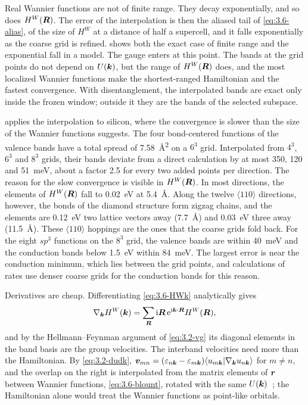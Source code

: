 Real Wannier functions are not of finite range. They decay exponentially, and so does $H^W(\bm{R})$. The error of the interpolation is then the aliased tail of \cref{eq:3.6-alias}, of the size of $H^W$ at a distance of half a supercell, and it falls exponentially as the coarse grid is refined.  shows both the exact case of finite range and the exponential fall in a model. The gauge enters at this point. The bands at the grid points do not depend on $U(\bm{k})$, but the range of $H^W(\bm{R})$ does, and the most localized Wannier functions make the shortest-ranged Hamiltonian and the fastest convergence. With disentanglement, the interpolated bands are exact only inside the frozen window; outside it they are the bands of the selected subspace.

 applies the interpolation to silicon, where the convergence is slower than the size of the Wannier functions suggests. The four bond-centered functions of the valence bands have a total spread of \SI{7.58}{\angstrom^2} on a $6^3$ grid. Interpolated from $4^3$, $6^3$ and $8^3$ grids, their bands deviate from a direct calculation by at most 350, 120 and \SI{51}{meV}, about a factor 2.5 for every two added points per direction. The reason for the slow convergence is visible in $H^W(\bm{R})$. In most directions, the elements of $H^W(\bm{R})$ fall to \SI{0.02}{eV} at \SI{5.4}{\angstrom}. Along the twelve $\langle110\rangle$ directions, however, the bonds of the diamond structure form zigzag chains, and the elements are \SI{0.12}{eV} two lattice vectors away (\SI{7.7}{\angstrom}) and \SI{0.03}{eV} three away (\SI{11.5}{\angstrom}). These $\langle110\rangle$ hoppings are the ones that the coarse grids fold back. For the eight $sp^3$ functions on the $8^3$ grid, the valence bands are within \SI{40}{meV} and the conduction bands below \SI{1.5}{eV} within \SI{84}{meV}. The largest error is near the conduction minimum, which lies between the grid points, and calculations of rates use denser coarse grids for the conduction bands for this reason.

Derivatives are cheap. Differentiating \cref{eq:3.6-HWk} analytically gives
\begin{equation*}
  \nabla_{\bm{k}}H^W(\bm{k}) = \sum_{\bm{R}}\mathrm{i}\bm{R}\,\mathrm{e}^{\mathrm{i}\bm{k}\cdot\bm{R}}H^W(\bm{R}) ,
\end{equation*}
and by the Hellmann--Feynman argument of \cref{eq:3.2-vg} its diagonal elements in the band basis are the group velocities. The interband velocities need more than the Hamiltonian. By \cref{eq:3.2-dudk}, $\bm{v}_{mn} = (\varepsilon_{n\bm{k}} - \varepsilon_{m\bm{k}})\langle u_{m\bm{k}}|\nabla_{\bm{k}}u_{n\bm{k}}\rangle$ for $m \ne n$, and the overlap on the right is interpolated from the matrix elements of $\bm{r}$ between Wannier functions, \cref{eq:3.6-blount}, rotated with the same $U(\bm{k})$~\cite[Eqs.~(106)--(109)]{marzari2012maximally}; the Hamiltonian alone would treat the Wannier functions as point-like orbitals.

